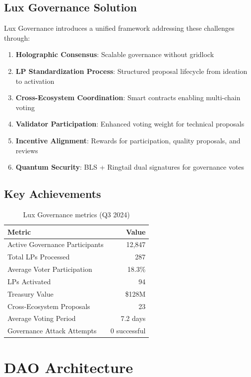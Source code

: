 \documentclass[11pt,a4paper]{article}
\begin{document}
\subsection{Lux Governance Solution}

Lux Governance introduces a unified framework addressing these challenges through:

\begin{enumerate}
\item \textbf{Holographic Consensus}: Scalable governance without gridlock
\item \textbf{LP Standardization Process}: Structured proposal lifecycle from ideation to activation
\item \textbf{Cross-Ecosystem Coordination}: Smart contracts enabling multi-chain voting
\item \textbf{Validator Participation}: Enhanced voting weight for technical proposals
\item \textbf{Incentive Alignment}: Rewards for participation, quality proposals, and reviews
\item \textbf{Quantum Security}: BLS + Ringtail dual signatures for governance votes
\end{enumerate}

\subsection{Key Achievements}

\begin{table}[h]
\centering
\begin{tabular}{@{}lr@{}}
\toprule
\textbf{Metric} & \textbf{Value} \\ \midrule
Active Governance Participants & 12,847 \\
Total LPs Processed & 287 \\
Average Voter Participation & 18.3\% \\
LPs Activated & 94 \\
Treasury Value & \$128M \\
Cross-Ecosystem Proposals & 23 \\
Average Voting Period & 7.2 days \\
Governance Attack Attempts & 0 successful \\ \bottomrule
\end{tabular}
\caption{Lux Governance metrics (Q3 2024)}
\end{table}

\section{DAO Architecture}
\end{document}
